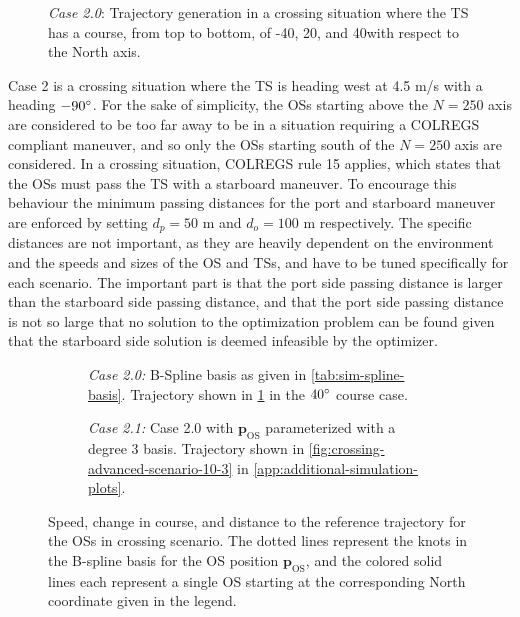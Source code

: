 \begin{figure}[htbp]
    \centering

    \caption{\emph{Case 2.0}: Trajectory generation in a crossing situation where the TS has a course, from top to bottom, of -40\degree, 20\degree, and 40\degree with respect to the North axis.}
    \label{fig:crossing}
\end{figure}



Case 2 is a crossing situation where the TS is heading west at 4.5 m/s with a heading $-90\degree$. For the sake of simplicity, the OSs starting above the $N=250$ axis are considered to be too far away to be in a situation requiring a COLREGS compliant maneuver, and so only the OSs starting south of the $N=250$ axis are considered. In a crossing situation, COLREGS rule 15 applies, which states that the OSs must pass the TS with a starboard maneuver. To encourage this behaviour the minimum passing distances for the port and starboard maneuver are enforced by setting $d_p=50$ m and $d_o=100$ m respectively. The specific distances are not important, as they are heavily dependent on the environment and the speeds and sizes of the OS and TSs, and have to be tuned specifically for each scenario. The important part is that the port side passing distance is larger than the starboard side passing distance, and that the port side passing distance is not so large that no solution to the optimization problem can be found given that the starboard side solution is deemed infeasible by the optimizer.


\begin{figure}
    \centering
    \begin{subfigure}[b]{\textwidth}
        
        \caption{\emph{Case 2.0:} B-Spline basis as given in \cref{tab:sim-spline-basis}. Trajectory shown in \cref{fig:crossing} in the $40\degree$ course case.}
        \label{fig:crossing-metrics}
    \end{subfigure}
    \begin{subfigure}[b]{\textwidth}
        
        \caption{\emph{Case 2.1:}  Case 2.0 with $\mathbf p_\text{OS}$ parameterized with a degree 3 basis. Trajectory shown in \cref{fig:crossing-advanced-scenario-10-3} in \cref{app:additional-simulation-plots}.}
        \label{fig:crossing-scenario-degree-3-metrics}
    \end{subfigure}
    \caption{Speed, change in course, and distance to the reference trajectory for the OSs in crossing scenario. The dotted lines represent the knots in the B-spline basis for the OS position $\mathbf p_\text{OS}$, and the colored solid lines each represent a single OS starting at the corresponding North coordinate given in the legend.}
    \label{fig:crossing-scenario-metrics}
\end{figure}



